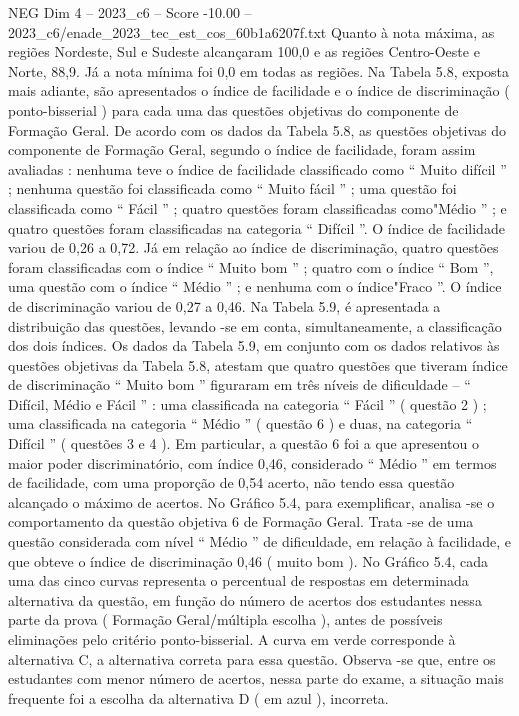 \begin{textsample}{NEG Dim 4 – 2023\_c6 – Score -10.00 – 2023\_c6/enade\_2023\_tec\_est\_cos\_60b1a6207f.txt}
Quanto à nota máxima, as regiões Nordeste, Sul e Sudeste alcançaram 100,0 e as regiões Centro-Oeste e Norte, 88,9.
Já a nota mínima foi 0,0 em todas as regiões.
Na Tabela 5.8, exposta mais adiante, são apresentados o índice de facilidade e o índice de discriminação ( ponto-bisserial ) para cada uma das questões objetivas do componente de Formação Geral.
De acordo com os dados da Tabela 5.8, as questões objetivas do componente de Formação Geral, segundo o índice de facilidade, foram assim avaliadas : nenhuma teve o índice de facilidade classificado como “ Muito difícil ” ; nenhuma questão foi classificada como “ Muito fácil ” ; uma questão foi classificada como “ Fácil ” ; quatro questões foram classificadas como"Médio ” ; e quatro questões foram classificadas na categoria “ Difícil ”.
O índice de facilidade variou de 0,26 a 0,72.
Já em relação ao índice de discriminação, quatro questões foram classificadas com o índice “ Muito bom ” ; quatro com o índice “ Bom ”, uma questão com o índice “ Médio ” ; e nenhuma com o índice"Fraco ”.
O índice de discriminação variou de 0,27 a 0,46.
Na Tabela 5.9, é apresentada a distribuição das questões, levando -se em conta, simultaneamente, a classificação dos dois índices.
Os dados da Tabela 5.9, em conjunto com os dados relativos às questões objetivas da Tabela 5.8, atestam que quatro questões que tiveram índice de discriminação “ Muito bom ” figuraram em três níveis de dificuldade – “ Difícil, Médio e Fácil ” : uma classificada na categoria “ Fácil ” ( questão 2 ) ; uma classificada na categoria “ Médio ” ( questão 6 ) e duas, na categoria “ Difícil ” ( questões 3 e 4 ).
Em particular, a questão 6 foi a que apresentou o maior poder discriminatório, com índice 0,46, considerado “ Médio ” em termos de facilidade, com uma proporção de 0,54 acerto, não tendo essa questão alcançado o máximo de acertos.
No Gráfico 5.4, para exemplificar, analisa -se o comportamento da questão objetiva 6 de Formação Geral.
Trata -se de uma questão considerada com nível “ Médio ” de dificuldade, em relação à facilidade, e que obteve o índice de discriminação 0,46 ( muito bom ).
No Gráfico 5.4, cada uma das cinco curvas representa o percentual de respostas em determinada alternativa da questão, em função do número de acertos dos estudantes nessa parte da prova ( Formação Geral/múltipla escolha ), antes de possíveis eliminações pelo critério ponto-bisserial.
A curva em verde corresponde à alternativa C, a alternativa correta para essa questão.
Observa -se que, entre os estudantes com menor número de acertos, nessa parte do exame, a situação mais frequente foi a escolha da alternativa D ( em azul ), incorreta.

\end{textsample}
